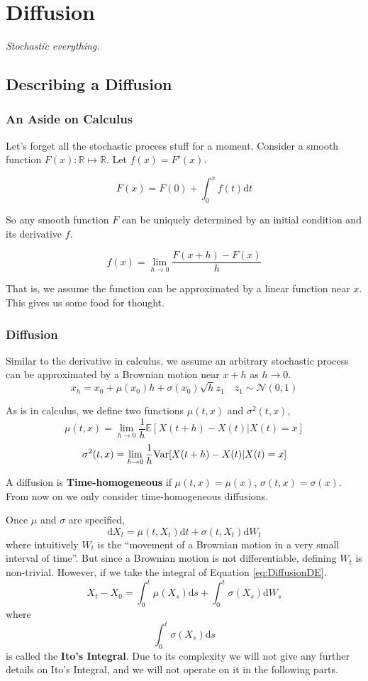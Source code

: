\chapter{Diffusion}
\emph{Stochastic everything.}
\newpage

\section{Describing a Diffusion}
    \subsection{An Aside on Calculus}
        Let's forget all the stochastic process stuff for a moment. Consider a smooth function $F(x):\mathbb{R} \mapsto \mathbb{R}$. Let $f(x) = F'(x)$.

        \[ F(x) = F(0) + \int_0^x f(t) \mathrm{d}t \]

        So any smooth function $F$ can be uniquely determined by an initial condition and its derivative $f$.

        \[ f(x) = \lim_{h \to 0} \frac{F(x+h)-F(x)}{h} \]

        That is, we assume the function can be approximated by a linear function near $x$. This gives us some food for thought.

    \subsection{Diffusion}
        Similar to the derivative in calculus, we assume an arbitrary stochastic process can be approximated by a Brownian motion near $x+h$ as $h \to 0$.
        \[ x_h = x_0 + \mu(x_0)h + \sigma(x_0)\sqrt{h}z_1 \quad z_1 \sim \mathcal{N}(0,1) \]

        As is in calculus, we define two functions $\mu(t,x)$ and $\sigma^2(t,x)$,
        \[ \mu(t,x) = \lim_{h \to 0}\frac{1}{h}\mathbb{E}[X(t+h)-X(t)|X(t)=x] \]
        \[ \sigma^2(t,x) = \lim_{h \to 0}\frac{1}{h}\mathrm{Var}[X(t+h)-X(t)|X(t)=x] \]

        A diffusion is \textbf{Time-homogeneous} if $\mu(t,x) = \mu(x)$, $\sigma(t,x) = \sigma(x)$. From now on we only consider time-homogeneous diffusions.

        Once $\mu$ and $\sigma$ are specified,
        \begin{equation}\label{eq:DiffusionDE} \mathrm{d}X_t = \mu(t,X_t)\mathrm{d}t + \sigma(t,X_t)\mathrm{d}W_t \end{equation}
        where intuitively $W_t$ is the ``movement of a Brownian motion in a very small interval of time''. But since a Brownian motion is not differentiable, defining $W_t$ is non-trivial. However, if we take the integral of Equation \ref{eq:DiffusionDE}.
        \[ X_t - X_0 = \int_0^t \mu(X_s)\mathrm{d}s + \int_0^t \sigma(X_s)\mathrm{d}W_s \]
        where
        \[ \int_0^t \sigma(X_s)\mathrm{d}s \]
        is called the \textbf{Ito's Integral}. Due to its complexity we will not give any further details on Ito's Integral, and we will not operate on it in the following parts.


